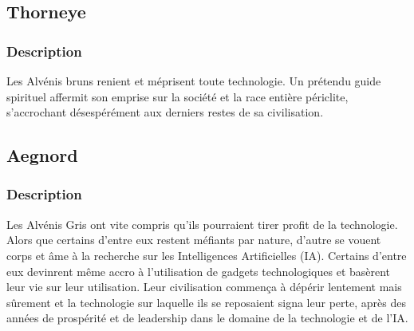 \subsection{Thorneye}
\subsubsection{Description}
Les Alvénis bruns renient et méprisent toute technologie. Un prétendu guide spirituel affermit son emprise sur la société et la race entière périclite, s'accrochant désespérément aux derniers restes de sa civilisation.
\subsection{Aegnord} 
\subsubsection{Description}
Les Alvénis Gris ont vite compris qu'ils pourraient tirer profit de la technologie. Alors que certains d'entre eux restent méfiants par nature, d'autre se vouent corps et âme à la recherche sur les Intelligences Artificielles (IA). Certains d'entre eux devinrent même accro à l'utilisation de gadgets technologiques et basèrent leur vie sur leur utilisation. Leur civilisation commença à dépérir lentement mais sûrement et la technologie sur laquelle ils se reposaient signa leur perte, après des années de prospérité et de leadership dans le domaine de la technologie et de l'IA.
